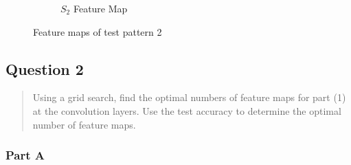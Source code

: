 \begin{figure}[H]
\begin{subfigure}{0.5\textwidth}
        \caption{$\textit{S}_2$ Feature Map}
    \end{subfigure}
    \caption{Feature maps of test pattern 2}
    \label{fig:1b_2}
\end{figure}

\subsection{Question 2}
\label{1q2}
\begin{quote}
Using a grid search, find the optimal numbers of feature maps for part (1) at the convolution layers. Use the test accuracy to determine the optimal number of feature maps.
\end{quote}

\subsubsection{Part A}
